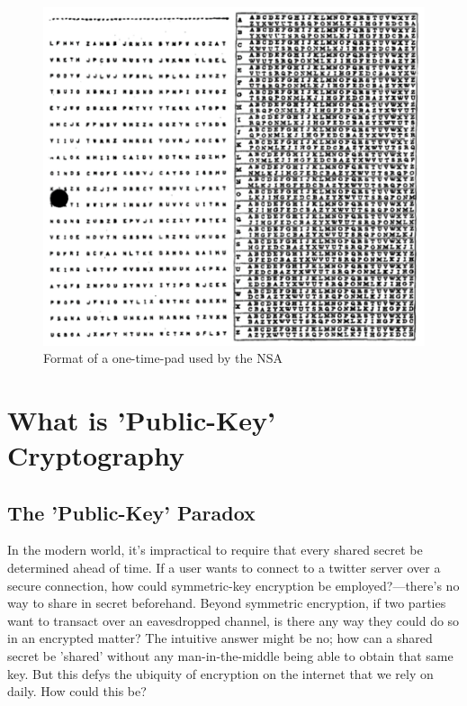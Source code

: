 \documentclass[11pt, a4paper]{report}
\begin{document}
\begin{figure}[h]
\begin{center}
\includegraphics[scale=.29]{diana} 
\caption{Format of a one-time-pad used by the NSA\autocite{diana}}
\end{center}
\end{figure}


\section{What is 'Public-Key' Cryptography}

\subsection{The 'Public-Key' Paradox}

In the modern world, it's impractical to require that every shared secret be determined ahead of time. If a user wants to connect to a twitter server over a secure connection, how could symmetric-key encryption be employed?—there's no way to share in secret beforehand.
Beyond symmetric encryption, if two parties want to transact over an eavesdropped channel, is there any way they could do so in an encrypted matter? The intuitive answer might be no; how can a shared secret be 'shared' without any man-in-the-middle being able to obtain that same key. But this defys the ubiquity of encryption on the internet that we rely on daily. How could this be?
\end{document}
